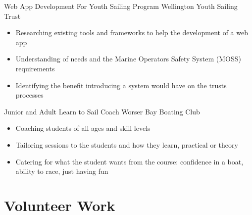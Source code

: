 \documentclass[a4paper]{twentysecondcv} %
\begin{document}
\begin{workexperience}
    {Web App Development For Youth Sailing Program}
    {Wellington Youth Sailing Trust}
    {
        \begin{itemize}
            \item Researching existing tools and frameworks to help the development of a web app
            \item Understanding of needs and the Marine Operators Safety System (MOSS) requirements
            \item Identifying the benefit introducing a system would have on the trusts processes
        \end{itemize}
    }

    {Junior and Adult Learn to Sail Coach}
    {Worser Bay Boating Club}
    {
        \begin{itemize}
            \item Coaching students of all ages and skill levels
            \item Tailoring sessions to the students and how they learn, practical or theory
            \item Catering for what the student wants from the course: confidence in a boat, ability to race, just having fun
        \end{itemize}
    }

\end{workexperience}


\section{Volunteer Work}

\begin{twentyshort} %

\end{twentyshort}


\end{document}
